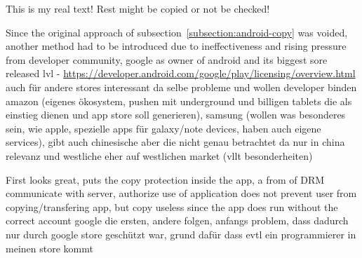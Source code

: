 This is my real text! Rest might be copied or not be checked!

Since the original approach of subsection~\ref{subsection:android-copy} was voided, another method had to be introduced due to ineffectiveness and rising pressure from developer community, google as owner of android and its biggest sore released lvl - \url{https://developer.android.com/google/play/licensing/overview.html}
auch für andere stores interessant da selbe probleme und wollen developer binden
amazon (eigenes ökosystem, pushen mit underground und billigen tablets die als einstieg dienen und app store soll generieren), samsung (wollen was besonderes sein, wie apple, spezielle apps für galaxy/note devices, haben auch eigene services), gibt auch chinesische aber die nicht genau betrachtet da nur in china relevanz und westliche eher auf westlichen market (vllt besonderheiten)
\cite{munteanLicensing}





First looks great, puts the copy protection inside the app, a from of DRM\newline
communicate with server, authorize use of application\newline
does not prevent user from copying/transfering app, but copy useless since the app does run without the correct account\newline
google die ersten, andere folgen, anfangs problem, dass dadurch nur durch google store geschützt war, grund dafür dass evtl ein programmierer in meinen store kommt\newline
